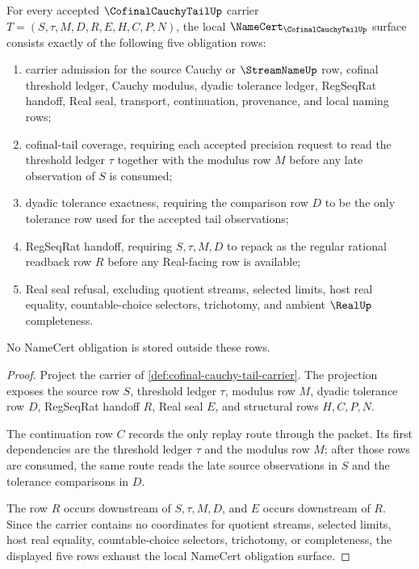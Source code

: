 \begin{theorem}
\label{thm:cofinal-cauchy-tail-namecert-obligations}
For every accepted $\CofinalCauchyTailUp$ carrier $T=(S,\tau,M,D,R,E,H,C,P,N)$, the local $\NameCert_{\CofinalCauchyTailUp}$ surface consists exactly of the following five obligation rows:
\begin{enumerate}
\item carrier admission for the source Cauchy or $\StreamNameUp$ row, cofinal threshold ledger, Cauchy modulus, dyadic tolerance ledger, RegSeqRat handoff, Real seal, transport, continuation, provenance, and local naming rows;
\item cofinal-tail coverage, requiring each accepted precision request to read the threshold ledger $\tau$ together with the modulus row $M$ before any late observation of $S$ is consumed;
\item dyadic tolerance exactness, requiring the comparison row $D$ to be the only tolerance row used for the accepted tail observations;
\item RegSeqRat handoff, requiring $S,\tau,M,D$ to repack as the regular rational readback row $R$ before any Real-facing row is available;
\item Real seal refusal, excluding quotient streams, selected limits, host real equality, countable-choice selectors, trichotomy, and ambient $\RealUp$ completeness.
\end{enumerate}
No NameCert obligation is stored outside these rows.
\end{theorem}
\begin{proof}
Project the carrier of \autoref{def:cofinal-cauchy-tail-carrier}. The projection exposes the source row $S$, threshold ledger $\tau$, modulus row $M$, dyadic tolerance row $D$, RegSeqRat handoff $R$, Real seal $E$, and structural rows $H,C,P,N$.

The continuation row $C$ records the only replay route through the packet. Its first dependencies are the threshold ledger $\tau$ and the modulus row $M$; after those rows are consumed, the same route reads the late source observations in $S$ and the tolerance comparisons in $D$.

The row $R$ occurs downstream of $S,\tau,M,D$, and $E$ occurs downstream of $R$. Since the carrier contains no coordinates for quotient streams, selected limits, host real equality, countable-choice selectors, trichotomy, or completeness, the displayed five rows exhaust the local NameCert obligation surface.
\end{proof}

